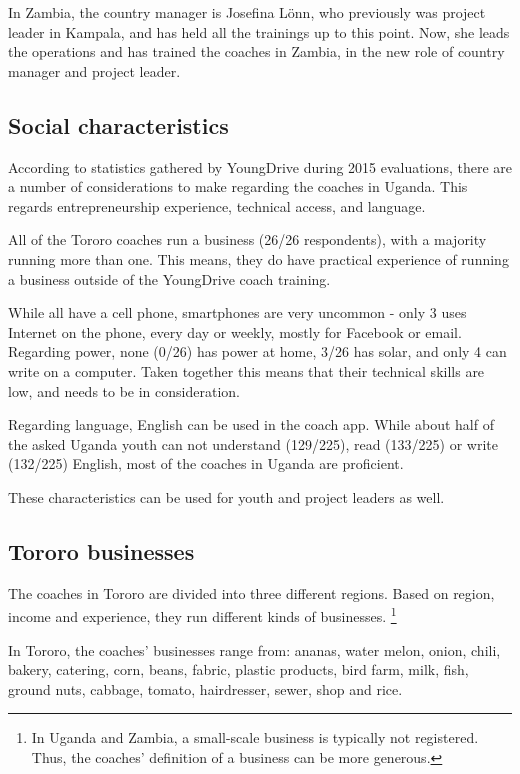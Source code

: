 In Zambia, the country manager is Josefina Lönn, who previously was project leader in Kampala, and has held all the trainings up to this point. Now, she leads the operations and has trained the coaches in Zambia, in the new role of country manager and project leader.

\subsection{Social characteristics}

According to statistics gathered by YoungDrive during 2015 evaluations, there are a number of considerations to make regarding the coaches in Uganda. This regards entrepreneurship experience, technical access, and language.

All of the Tororo coaches run a business (26/26 respondents), with a majority running more than one. This means, they do have practical experience of running a business outside of the YoungDrive coach training.

While all have a cell phone, smartphones are very uncommon - only 3 uses Internet on the phone, every day or weekly, mostly for Facebook or email. Regarding power, none (0/26) has power at home, 3/26 has solar, and only 4 can write on a computer. Taken together this means that their technical skills are low, and needs to be in consideration.

Regarding language, English can be used in the coach app. While about half of the asked Uganda youth can not understand (129/225), read (133/225) or write (132/225) English, most of the coaches in Uganda are proficient.

These characteristics can be used for youth and project leaders as well.

\subsection{Tororo businesses}

The coaches in Tororo are divided into three different regions. Based on region, income and experience, they run different kinds of businesses. \footnote{In Uganda and Zambia, a small-scale business is typically not registered. Thus, the coaches' definition of a business can be more generous.}

In Tororo, the coaches' businesses range from: ananas, water melon, onion, chili, bakery, catering, corn, beans, fabric, plastic products, bird farm, milk, fish, ground nuts, cabbage, tomato, hairdresser, sewer, shop and rice.

